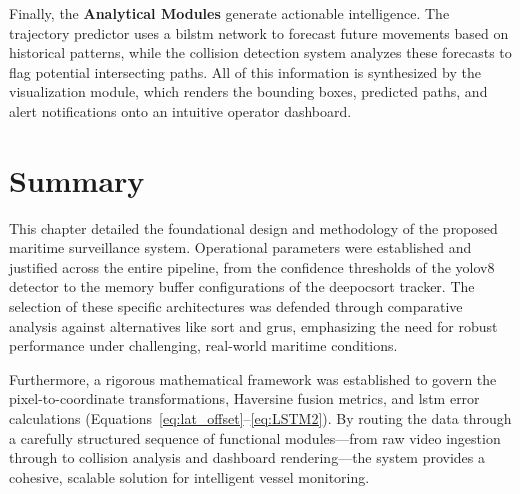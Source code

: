 Finally, the \textbf{Analytical Modules} generate actionable intelligence. The trajectory predictor uses a \gls{bilstm} network to forecast future movements based on historical patterns, while the collision detection system analyzes these forecasts to flag potential intersecting paths. All of this information is synthesized by the visualization module, which renders the bounding boxes, predicted paths, and alert notifications onto an intuitive operator dashboard.

\section{Summary}
This chapter detailed the foundational design and methodology of the proposed maritime surveillance system. Operational parameters were established and justified across the entire pipeline, from the confidence thresholds of the \gls{yolov8} detector to the memory buffer configurations of the \gls{deepocsort} tracker. The selection of these specific architectures was defended through comparative analysis against alternatives like \gls{sort} and \glspl{gru}, emphasizing the need for robust performance under challenging, real-world maritime conditions. 

Furthermore, a rigorous mathematical framework was established to govern the pixel-to-coordinate transformations, Haversine fusion metrics, and \gls{lstm} error calculations (Equations~\ref{eq:lat_offset}--\ref{eq:LSTM2}). By routing the data through a carefully structured sequence of functional modules—from raw video ingestion through to collision analysis and dashboard rendering—the system provides a cohesive, scalable solution for intelligent vessel monitoring.